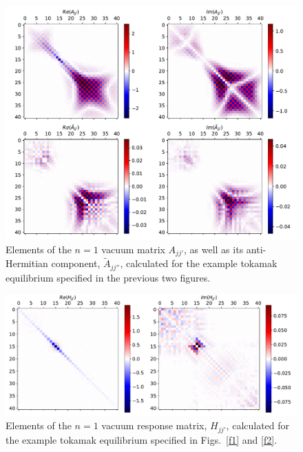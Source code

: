 \documentclass[12pt,prb,aps]{revtex4-1}
\begin{document}
\begin{figure}
\centerline{\includegraphics[width=\textwidth]{Figure3.pdf}}
\caption{Elements of the $n=1$ vacuum matrix $A_{jj'}$, as well as its anti-Hermitian component, $\tilde{A}_{jj''}$, calculated for the example
tokamak equilibrium specified in the previous two figures.}\label{f3}
\end{figure}

\begin{figure}
\centerline{\includegraphics[width=\textwidth]{Figure4.pdf}}
\caption{Elements of the $n=1$ vacuum response  matrix, $H_{jj'}$, calculated for the example
tokamak equilibrium specified in Figs.~\ref{f1} and \ref{f2}.}\label{f4}
\end{figure}
\end{document}
